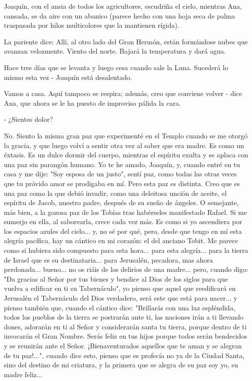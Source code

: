 \documentclass[12pt, twoside, openright]{book} %
\begin{document}
Joaquín, con el ansia de todos los agricultores, escudriña el cielo, mientras Ana, cansada, se da aire con un abanico (parece hecho con una hoja seca de palma traspasada por hilos multicolores que la mantienen rígida). 

La pariente dice: Allí, al otro lado del Gran Hermón, están formándose nubes que avanzan velozmente. Viento del norte. Bajará la temperatura y dará agua. 

Hace tres días que se levanta y luego cesa cuando sale la Luna. Sucederá lo mismo esta vez - Joaquín está desalentado. 

Vamos a casa. Aquí tampoco se respira; además, creo que conviene volver - dice Ana, que ahora se le ha puesto de improviso pálida la cara. 

- ¿Sientes dolor? 

No. Siento la misma gran paz que experimenté en el Templo cuando se me otorgó la gracia, y que luego volví a sentir otra vez al saber que era madre. Es como un éxtasis. Es un dulce dormir del cuerpo, mientras el espíritu exulta y se aplaca con una paz sin parangón humano. Yo te he amado, Joaquín, y, cuando entré en tu casa y me dije: "Soy esposa de un justo", sentí paz, como todas las otras veces que tu próvido amor se prodigaba en mí. Pero esta paz es distinta. Creo que es una paz como la que debió invadir, como una deleitosa unción de aceite, el espíritu de Jacob, nuestro padre, después de su sueño de ángeles. O semejante, más bien, a la gozosa paz de los Tobías tras habérseles manifestado Rafael. Si me sumerjo en ella, al saborearla, crece cada vez más. Es como si yo ascendiera por los espacios azules del cielo... y, no sé por qué, pero, desde que tengo en mí esta alegría pacífica, hay un cántico en mi corazón: el del anciano Tobit. Me parece como si hubiera sido compuesto para esta hora... para esta alegría... para la tierra de Israel que es su destinataria... para Jerusalén, pecadora, mas ahora perdonada... bueno... no os riáis de los delirios de una madre... pero, cuando digo: "Da gracias al Señor por tus bienes y bendice al Dios de los siglos para que vuelva a edificar en ti su Tabernáculo", yo pienso que aquel que reedificará en Jerusalén el Tabernáculo del Dios verdadero, será este que está para nacer... y pienso también que, cuando el cántico dice: "Brillarás con una luz espléndida, todos los pueblos de la tierra se postrarán ante ti, las naciones irán a ti llevando dones, adorarán en ti al Señor y considerarán santa tu tierra, porque dentro de ti invocarán el Gran Nombre. Serás feliz en tus hijos porque todos serán bendecidos y se reunirán ante el Señor. ¡Bienaventurados aquellos que te aman y se alegran de tu paz!...", cuando dice esto, pienso que es profecía no ya de la Ciudad Santa, sino del destino de mi criatura, y la primera que se alegra de su paz soy yo, su madre feliz... 
\end{document}
